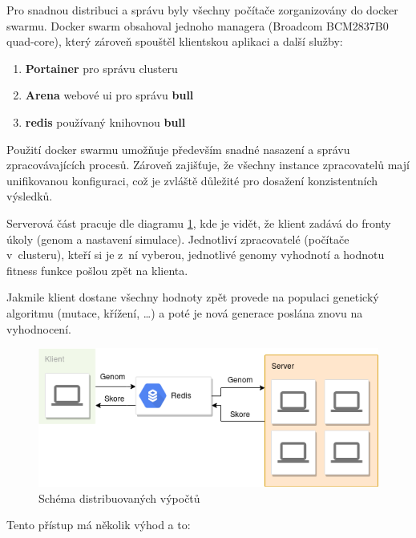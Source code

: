 Pro snadnou distribuci a správu byly všechny počítače zorganizovány do docker swarmu. Docker swarm obsahoval jednoho managera (Broadcom BCM2837B0 quad-core), který zároveň spouštěl klientskou aplikaci a další služby:

\begin{enumerate}
	\item \textbf{Portainer} pro správu clusteru
	\item \textbf{Arena} webové ui pro správu \textbf{bull}
	\item \textbf{redis} používaný knihovnou \textbf{bull}
\end{enumerate}

Použití docker swarmu umožňuje především snadné nasazení a správu zpracovávajících procesů. Zároveň zajišťuje, že všechny instance zpracovatelů mají unifikovanou konfiguraci, což je zvláště důležité pro dosažení konzistentních výsledků.

Serverová část pracuje dle diagramu \ref{fig:distributed}, kde je vidět, že klient zadává do fronty úkoly (genom a nastavení simulace). Jednotliví zpracovatelé (počítače v~clusteru), kteří si je z~ní vyberou, jednotlivé genomy vyhodnotí a hodnotu fitness funkce pošlou zpět na klienta. 

Jakmile klient dostane všechny hodnoty zpět provede na populaci genetický algoritmu (mutace, křížení, \dots) a poté je nová generace poslána znovu na vyhodnocení.

\begin{figure}[h!]
	\centering
	\includegraphics[scale=0.5]{distributed}
	\caption[Schéma distribuovaných výpočtů]{Schéma distribuovaných výpočtů}
	\label{fig:distributed}
\end{figure}

Tento přístup má několik výhod a to:

